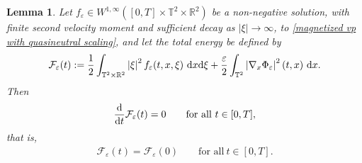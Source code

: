 \documentclass[11pt,reqno]{amsart}
\newtheorem{lem}[thm]{Lemma}
\numberwithin{equation}{section}
\def\dd{{\rm d}}
\begin{document}
\begin{lem} \label{time der of total energy}
Let $f_{\varepsilon}\in W^{1,\infty}([0,T]\times \mathbb{T}^{2}\times \mathbb{R}^{2})$ be a non-negative solution, with finite second velocity moment and sufficient decay as \(\lvert\xi\rvert\to\infty\), to  \eqref{magnetized vp with quasineutral scaling}, 
and let the total energy be defined by 
\begin{align*}
\mathcal{F}_{\varepsilon}(t):= \frac{1}{2}\int_{\mathbb{T}^{2}\times \mathbb{R}^{2}}\left\vert \xi\right\vert^{2}f_{\varepsilon}(t,x,\xi)\ \dd x\dd \xi
+\frac{\varepsilon}{2}\int_{\mathbb{T}^{2}}\left\vert \nabla_{x} 
\Phi_{\varepsilon}\right\vert^{2}(t,x)\ \dd x.    
\end{align*}
Then
\begin{align*}
\frac{\dd}{\dd t}\mathcal{\mathcal{F}}_{\varepsilon}(t)=0 
\qquad \mbox{for all}\ t\in [0,T],   
\end{align*}
that is,
\begin{align*}
\mathcal{F}_{\varepsilon}(t)=\mathcal{F}_{\varepsilon}(0)
\qquad \mbox{for all}\ t\in [0,T].     
\end{align*}
\end{lem}
\end{document}
